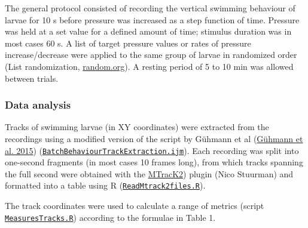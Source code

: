 \documentclass[
]{article}
\begin{document}
The general protocol consisted of recording the vertical swimming
behaviour of larvae for 10 s before pressure was increased as a step
function of time. Pressure was held at a set value for a defined amount
of time; stimulus duration was in most cases 60 s. A list of target
pressure values or rates of pressure increase/decrease were applied to
the same group of larvae in randomized order (List randomization,
\url{random.org}). A resting period of 5 to 10 min was allowed between
trials.

\hypertarget{data-analysis}{%
\subsubsection{Data analysis}\label{data-analysis}}

Tracks of swimming larvae (in XY coordinates) were extracted from the
recordings using a modified version of the script by Gühmann et al
(\protect\hyperlink{ref-ghmann_2015}{Gühmann et al. 2015})
(\href{https://github.com/JekelyLab/Bezares_et_al_2023_Pressure/blob/main/Code/BatchBehaviour/BatchBehaviourTrackExtraction.ijm}{\texttt{BatchBehaviourTrackExtraction.ijm}}).
Each recording was split into one-second fragments (in most cases 10
frames long), from which tracks spanning the full second were obtained
with the
\href{https://valelab4.ucsf.edu/~nstuurman/IJplugins/MTrack2.html}{MTracK2})
plugin (Nico Stuurman) and formatted into a table using R
(\href{https://github.com/JekelyLab/Bezares_et_al_2023_Pressure/blob/main/Code/BatchBehaviour/ReadMtrack2files.R}{\texttt{ReadMtrack2files.R}}).

The track coordinates were used to calculate a range of metrics (script
\href{https://github.com/JekelyLab/Bezares_et_al_2023_Pressure/blob/main/Code/BatchBehaviour/MeasuresTracks.R}{\texttt{MeasuresTracks.R}})
according to the formulae in Table 1.
\end{document}
